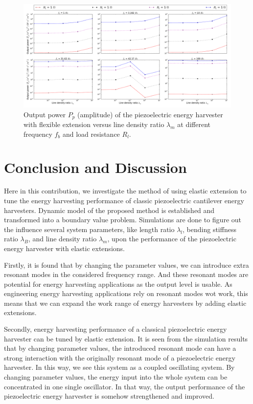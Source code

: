 \documentclass{elsarticle}
\begin{document}
\begin{figure}[!htbp]
    \centering
    \includegraphics[width=\textwidth]{./fig_pow_fr_sl_Rl_sl_vs_lamm}
    \caption{Output power $P_p$ (amplitude) of the piezoelectric energy harvester with flexible extension versus line density ratio $\lambda_m$ at different frequency $f_b$ and load resistance $R_l$. \color{red}{legend to be revised} }
    \label{fig:fig_pow_fr_sl_Rl_sl_vs_lamm}
\end{figure}


\section{Conclusion and Discussion}

Here in this contribution, we investigate the method of using elastic extension to tune the energy harvesting performance of classic piezoelectric cantilever energy harvesters. Dynamic model of the proposed method is established and transformed into a boundary value problem. Simulations are done to figure out the influence several system parameters, like length ratio $\lambda_l$, bending stiffness ratio $\lambda_B$, and line density ratio $\lambda_m$, upon the performance of the piezoelectric energy harvester with elastic extensions. 

Firstly, it is found that by changing the parameter values, we can introduce extra resonant modes in the considered frequency range. And these resonant modes are potential for energy harvesting applications as the output level is usable. As engineering energy harvesting applications rely on resonant modes wot work, this means that we can expand the work range of energy harvesters by adding elastic extensions.

Secondly, energy harvesting performance of a classical piezoelectric energy harvester can be tuned by elastic extension. It is seen from the simulation results that by changing parameter values, the introduced resonant mode can have a strong interaction with the originally resonant mode of a piezoelectric energy harvester. In this way, we see this system as a coupled oscillating system. By changing parameter values, the energy input into the whole system can be concentrated in one single oscillator. In that way, the output performance of the piezoelectric energy harvester is somehow strengthened and improved.
\end{document}

